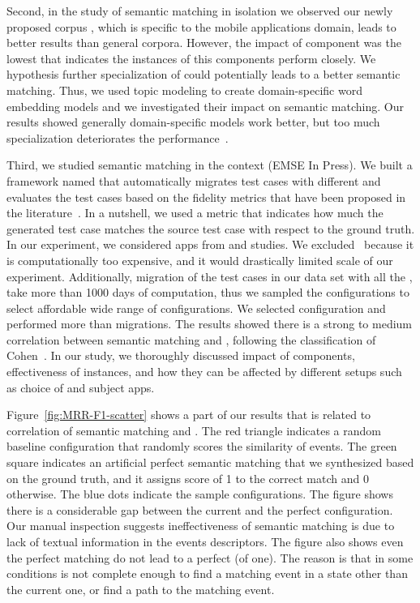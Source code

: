 \bigskip
Second, in the study of semantic matching in isolation we observed our newly proposed corpus \gp, which is specific to the mobile applications domain, leads to better results than general corpora.  
However, the impact of \corpus component was the lowest that indicates the instances of this components perform closely.
We hypothesis further specialization of \corpus could potentially leads to a better semantic matching.  
Thus, we used topic modeling to create domain-specific word embedding models and we investigated their impact on semantic matching.
Our results showed generally domain-specific models work better, but too much specialization deteriorates the performance~\cite{khalili:DomainEmbedding:ICPC:2022}.



\bigskip
Third, we studied semantic matching in the \testreuse context (EMSE In Press).
We built a framework named \tme that automatically migrates test cases with different \smconfigs and evaluates the test cases based on the fidelity metrics that have been proposed in the literature~\cite{zhao:fruiter:fse:2020}.
In a nutshell, we used a \fscore metric that indicates how much the generated test case matches the source test case with respect to the ground truth.
In our experiment, we considered  \nexecapps apps from \atm and \craftdroid studies.
We excluded \adaptdroid~\selector because it is computationally too expensive, and it would drastically limited scale of our experiment.
Additionally, migration of the test cases in our data set with all the \smconfigs, take more than 1000 days of computation, thus we sampled the configurations to select affordable wide range of configurations.  
We selected \nsampledcomb configuration and performed more than \nmigrations migrations.
The results showed there is a strong to medium correlation between semantic matching and \testreuse, following the classification of Cohen~\cite{cohen:statisticalpower:Routledge:2013}.
In our study, we  thoroughly discussed  impact of components, effectiveness of instances, and how they can be affected by different setups such as choice of \selector and subject apps.

\bigskip
Figure~\ref{fig:MRR-F1-scatter} shows a part of our results that is related to correlation of semantic matching and \testreuse.
The red triangle indicates a random baseline configuration that randomly scores the similarity of events.
The green square indicates an artificial perfect semantic matching that we synthesized based on the ground truth, and it  assigns score of 1 to the correct match and 0 otherwise.
The blue dots indicate the sample configurations.
The figure shows there is a considerable gap between the current \smconfigs and the perfect configuration. 
Our manual inspection suggests ineffectiveness of semantic matching is due to lack of textual information in the events descriptors.
The figure also shows even the perfect matching do not lead to a perfect \testreuse (\fscore of one).
The reason is that in some conditions \tam is not complete enough to find a matching event in a state other than the current one, or find a path to the matching event.




